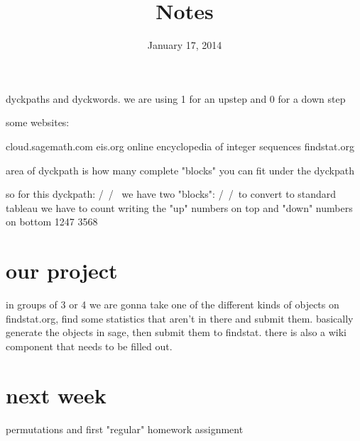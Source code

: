 \documentclass{article}
\begin{document}
\title{Notes}
\date{January 17, 2014}
\maketitle

dyckpaths and dyckwords. we are using 1 for an upstep and 0 for a down step

some websites:

cloud.sagemath.com
eis.org online encyclopedia of integer sequences
findstat.org

area of dyckpath is how many complete "blocks" you can fit under the dyckpath

so for this dyckpath:
 /\/\
/    \/\
we have two "blocks":
 /\/\
/\/\/\/\
to convert to standard tableau we have to count writing the "up" numbers on top and "down" numbers on bottom
1247
3568

\section*{our project}
in groups of 3 or 4 we are gonna take one of the different kinds of objects on findstat.org, find some statistics that aren't in there and submit them. basically generate the objects in sage, then submit them to findstat. there is also a wiki component that needs to be filled out.
\section*{next week}
permutations and first "regular" homework assignment
\end{document}
